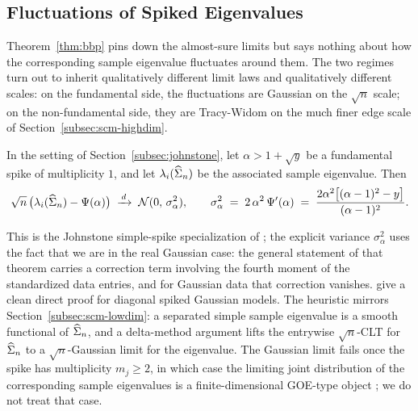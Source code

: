 \subsection{Fluctuations of Spiked Eigenvalues}\label{subsec:fluctuations}

Theorem~\ref{thm:bbp} pins down the almost-sure limits but says nothing about how the corresponding sample eigenvalue fluctuates around them. The two regimes turn out to inherit qualitatively different limit laws and qualitatively different scales: on the fundamental side, the fluctuations are Gaussian on the \(\sqrt{n}\) scale; on the non-fundamental side, they are Tracy-Widom on the much finer edge scale of Section~\ref{subsec:scm-highdim}.

\begin{theorem}\label{thm:fund-fluct}
In the setting of Section~\ref{subsec:johnstone}, let \(\alpha > 1 + \sqrt{y}\) be a fundamental spike of multiplicity \(1\), and let \(\lambda_i(\widehat{\Sigma}_n)\) be the associated sample eigenvalue. Then
\begin{equation}
  \sqrt{n}\,\bigl(\lambda_i(\widehat{\Sigma}_n) - \Psi(\alpha)\bigr) \;\xrightarrow{\,d\,}\; \mathcal{N}(0,\, \sigma_\alpha^2), \qquad
  \sigma_\alpha^2 \;=\; 2\, \alpha^2\, \Psi'(\alpha) \;=\; \frac{2 \alpha^2\bigl[(\alpha - 1)^2 - y\bigr]}{(\alpha - 1)^2}.
  \label{eq:fund-fluct}
\end{equation}
\end{theorem}

This is the Johnstone simple-spike specialization of \citet[][Thm.~11.11 and Eq.~(11.36)]{YaoZhengBai2015}; the explicit variance \(\sigma_\alpha^2\) uses the fact that we are in the real Gaussian case: the general statement of that theorem carries a correction term involving the fourth moment of the standardized data entries, and for Gaussian data that correction vanishes. \citet[][Thm.~1.6]{FeralPeche2009} give a clean direct proof for diagonal spiked Gaussian models. The heuristic mirrors Section~\ref{subsec:scm-lowdim}: a separated simple sample eigenvalue is a smooth functional of \(\widehat{\Sigma}_n\), and a delta-method argument lifts the entrywise \(\sqrt{n}\)-CLT for \(\widehat{\Sigma}_n\) to a \(\sqrt{n}\)-Gaussian limit for the eigenvalue. The Gaussian limit fails once the spike has multiplicity \(m_j \ge 2\), in which case the limiting joint distribution of the corresponding sample eigenvalues is a finite-dimensional GOE-type object \citep[][Eq.~(11.35)]{YaoZhengBai2015}; we do not treat that case.

